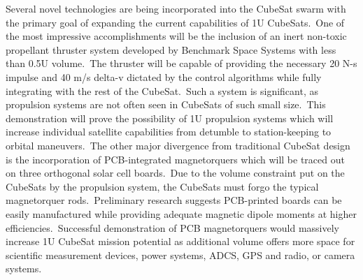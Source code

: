 Several novel technologies are being incorporated into the CubeSat
swarm with the primary goal of expanding the current capabilities of
1U CubeSats. One of the most impressive accomplishments will be the
inclusion of an inert non-toxic propellant thruster system developed
by Benchmark Space Systems with less than 0.5U volume. The thruster
will be capable of providing the necessary 20 N-s impulse and 40 m/s
delta-v dictated by the control algorithms while fully integrating
with the rest of the CubeSat. Such a system is significant, as
propulsion systems are not often seen in CubeSats of such small size. This demonstration will prove the possibility of 1U propulsion systems
which will increase individual satellite capabilities from detumble to
station-keeping to orbital maneuvers. The other major divergence from
traditional CubeSat design is the incorporation of PCB-integrated
magnetorquers which will be traced out on three orthogonal solar cell
boards. Due to the volume constraint put on the CubeSats by the
propulsion system, the CubeSats must forgo the typical magnetorquer
rods. Preliminary research suggests PCB-printed boards can be easily
manufactured while providing adequate magnetic dipole moments at
higher efficiencies. Successful demonstration of PCB magnetorquers
would massively increase 1U CubeSat mission potential as additional
volume offers more space for scientific measurement devices, power
systems, ADCS, GPS and radio, or camera systems. 
